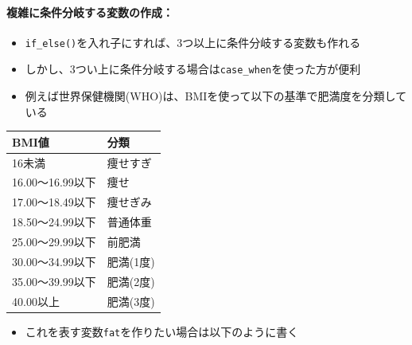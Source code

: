 \documentclass[
]{book}
\providecommand{\tightlist}{%
  \setlength{\itemsep}{0pt}\setlength{\parskip}{0pt}}
\begin{document}
\hypertarget{ux8907ux96d1ux306bux6761ux4ef6ux5206ux5c90ux3059ux308bux5909ux6570ux306eux4f5cux6210}{%
\paragraph*{複雑に条件分岐する変数の作成：}\label{ux8907ux96d1ux306bux6761ux4ef6ux5206ux5c90ux3059ux308bux5909ux6570ux306eux4f5cux6210}}

\begin{itemize}
\tightlist
\item
  \texttt{if\_else()}を入れ子にすれば、3つ以上に条件分岐する変数も作れる
\item
  しかし、3つい上に条件分岐する場合は\texttt{case\_when}を使った方が便利
\item
  例えば世界保健機関(WHO)は、BMIを使って以下の基準で肥満度を分類している
\end{itemize}

\begin{longtable}[]{@{}ll@{}}
\toprule()
BMI値 & 分類 \\
\midrule()
\endhead
16未満 & 痩せすぎ \\
16.00〜16.99以下 & 痩せ \\
17.00〜18.49以下 & 痩せぎみ \\
18.50〜24.99以下 & 普通体重 \\
25.00〜29.99以下 & 前肥満 \\
30.00〜34.99以下 & 肥満(1度) \\
35.00〜39.99以下 & 肥満(2度) \\
40.00以上 & 肥満(3度) \\
\bottomrule()
\end{longtable}

\begin{itemize}
\tightlist
\item
  これを表す変数\texttt{fat}を作りたい場合は以下のように書く
\end{itemize}
\end{document}
